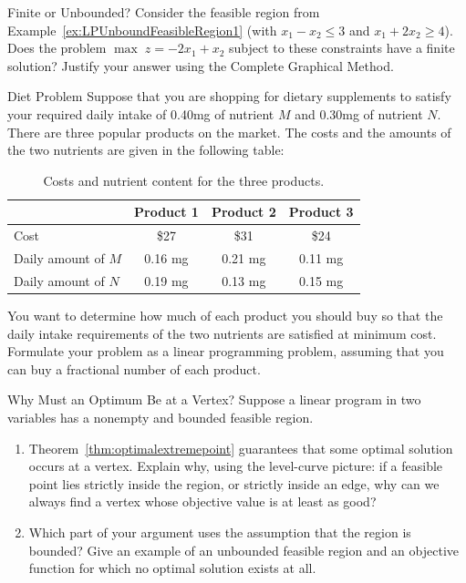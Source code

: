 \begin{ex}{Finite or Unbounded?}{}\label{exer:BoundedSolutionQuestion}
Consider the feasible region from Example~\ref{ex:LPUnboundFeasibleRegion1} (with $x_1-x_2\leq 3$ and $x_1+2x_2\geq 4$). Does the problem $\max\; z = -2x_1 + x_2$ subject to these constraints have a finite solution? Justify your answer using the Complete Graphical Method.
\end{ex}

\begin{ex}{Diet Problem}{}\label{ex:lp-diet-problem}
Suppose that you are shopping for dietary supplements to satisfy your
required daily intake of 0.40mg of nutrient \(M\) and 0.30mg of
nutrient \(N\). There are three popular products on the market. The
costs and the amounts of the two nutrients are given in the following
table:

\begin{table}[h!]
\centering
\begin{tabular}{lccc}
\toprule
         & Product 1 & Product 2 & Product 3 \\ \midrule
Cost     & \$27      & \$31      & \$24      \\
Daily amount of \(M\) & 0.16 mg   & 0.21 mg   & 0.11 mg   \\
Daily amount of \(N\) & 0.19 mg   & 0.13 mg   & 0.15 mg   \\ \bottomrule
\end{tabular}
\caption{Costs and nutrient content for the three products.}
\label{tab:diet-problem-data}
\end{table}

You want to determine how much of each product you should buy so that
the daily intake requirements of the two nutrients are satisfied at
minimum cost. Formulate your problem as a linear programming problem,
assuming that you can buy a fractional number of each product.
\end{ex}


\begin{ex}{Why Must an Optimum Be at a Vertex?}{}\label{ex:why-vertex}
Suppose a linear program in two variables has a nonempty and bounded feasible region.
\begin{enumerate}
\item Theorem~\ref{thm:optimalextremepoint} guarantees that some optimal solution occurs at a vertex. Explain why, using the level-curve picture: if a feasible point lies strictly inside the region, or strictly inside an edge, why can we always find a vertex whose objective value is at least as good?
\item Which part of your argument uses the assumption that the region is bounded? Give an example of an unbounded feasible region and an objective function for which no optimal solution exists at all.
\end{enumerate}
\end{ex}

